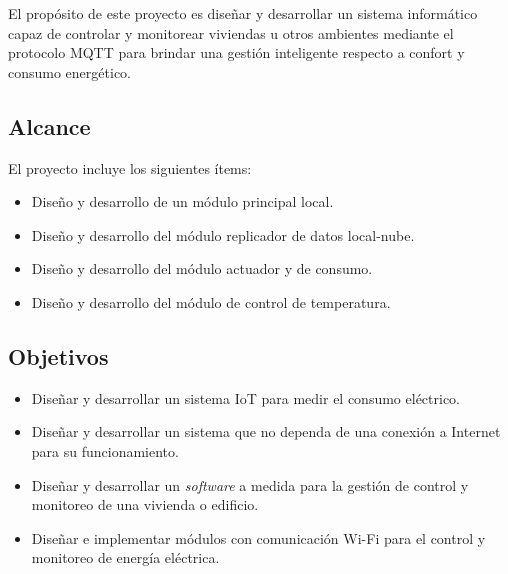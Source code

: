 El propósito de este proyecto es diseñar y desarrollar un sistema informático capaz de controlar y monitorear viviendas u otros ambientes mediante el protocolo MQTT para brindar una gestión inteligente respecto a confort y consumo energético.

\subsection{Alcance}

El proyecto incluye los siguientes ítems:
\begin{itemize}
\item Diseño y desarrollo de un módulo principal local.
\item Diseño y desarrollo del módulo replicador de datos local-nube.
\item Diseño y desarrollo del módulo actuador y de consumo.
\item Diseño y desarrollo del módulo de control de temperatura.
\end{itemize}

\subsection{Objetivos}
\begin{itemize}
\item Diseñar y desarrollar un sistema IoT para medir el consumo eléctrico.
\item Diseñar y desarrollar un sistema que no dependa de una conexión a Internet para su funcionamiento.
\item Diseñar y desarrollar un \emph{software} a medida para la gestión de control y monitoreo de una vivienda o edificio.
\item Diseñar e implementar módulos con comunicación Wi-Fi para el control y monitoreo de energía eléctrica.
\end{itemize}

\let\cleardoublepage\clearpage %